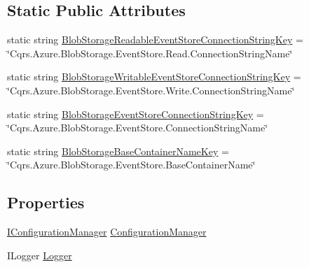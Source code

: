 \subsection*{Static Public Attributes}
\begin{DoxyCompactItemize}
\item 
static string \hyperlink{classCqrs_1_1Azure_1_1BlobStorage_1_1Events_1_1BlobStorageEventStoreConnectionStringFactory_a2b233edf7ad4cbc29872757006319527_a2b233edf7ad4cbc29872757006319527}{Blob\+Storage\+Readable\+Event\+Store\+Connection\+String\+Key} = \char`\"{}Cqrs.\+Azure.\+Blob\+Storage.\+Event\+Store.\+Read.\+Connection\+String\+Name\char`\"{}
\item 
static string \hyperlink{classCqrs_1_1Azure_1_1BlobStorage_1_1Events_1_1BlobStorageEventStoreConnectionStringFactory_a3bf39254f211e4fbcbd9bc108c8d9fbc_a3bf39254f211e4fbcbd9bc108c8d9fbc}{Blob\+Storage\+Writable\+Event\+Store\+Connection\+String\+Key} = \char`\"{}Cqrs.\+Azure.\+Blob\+Storage.\+Event\+Store.\+Write.\+Connection\+String\+Name\char`\"{}
\item 
static string \hyperlink{classCqrs_1_1Azure_1_1BlobStorage_1_1Events_1_1BlobStorageEventStoreConnectionStringFactory_a36edb24cf0ef60114fc344b5d0bb619d_a36edb24cf0ef60114fc344b5d0bb619d}{Blob\+Storage\+Event\+Store\+Connection\+String\+Key} = \char`\"{}Cqrs.\+Azure.\+Blob\+Storage.\+Event\+Store.\+Connection\+String\+Name\char`\"{}
\item 
static string \hyperlink{classCqrs_1_1Azure_1_1BlobStorage_1_1Events_1_1BlobStorageEventStoreConnectionStringFactory_affd6198f87e483bd7a6f5930a5eaa431_affd6198f87e483bd7a6f5930a5eaa431}{Blob\+Storage\+Base\+Container\+Name\+Key} = \char`\"{}Cqrs.\+Azure.\+Blob\+Storage.\+Event\+Store.\+Base\+Container\+Name\char`\"{}
\end{DoxyCompactItemize}
\subsection*{Properties}
\begin{DoxyCompactItemize}
\item 
\hyperlink{interfaceCqrs_1_1Configuration_1_1IConfigurationManager}{I\+Configuration\+Manager} \hyperlink{classCqrs_1_1Azure_1_1BlobStorage_1_1Events_1_1BlobStorageEventStoreConnectionStringFactory_adefd82b19551d994e27ce92bb0f0103d_adefd82b19551d994e27ce92bb0f0103d}{Configuration\+Manager}
\item 
I\+Logger \hyperlink{classCqrs_1_1Azure_1_1BlobStorage_1_1Events_1_1BlobStorageEventStoreConnectionStringFactory_a3149133c39d832a1ea78542bae2a9c2a_a3149133c39d832a1ea78542bae2a9c2a}{Logger}
\end{DoxyCompactItemize}


